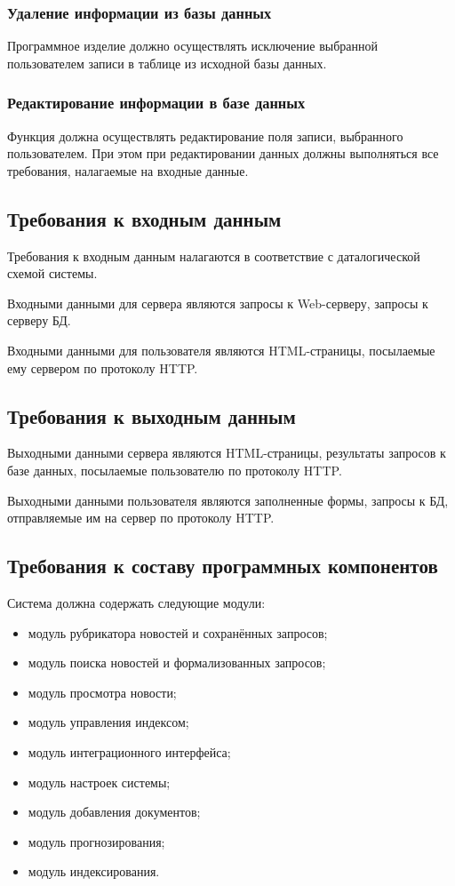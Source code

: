 \documentclass[russian,utf8,emptystyle]{eskdtext}
\begin{document}
\subsubsection{Удаление информации из базы данных}
Программное изделие должно осуществлять исключение выбранной пользователем записи в таблице из исходной базы данных.

\subsubsection{Редактирование информации в базе данных}

Функция должна осуществлять редактирование поля записи, выбранного пользователем. При этом при редактировании данных должны выполняться все требования, налагаемые на входные данные.

\subsection{Требования к входным данным}

Требования к входным данным налагаются в соответствие с даталогической схемой системы. 

Входными данными для сервера являются запросы к Web-серверу, запросы к серверу БД.

Входными данными для пользователя являются HTML-страницы, посылаемые ему сервером по протоколу HTTP.

\subsection{Требования к выходным данным}

Выходными данными сервера являются HTML-страницы, результаты запросов к базе данных, посылаемые пользователю по протоколу HTTP.

Выходными данными пользователя являются заполненные формы, запросы к БД, отправляемые им на сервер по протоколу HTTP.

\subsection{Требования к составу программных компонентов}

Система должна содержать следующие модули:
\begin{itemize}
\item модуль рубрикатора новостей и сохранённых запросов;
\item модуль поиска новостей и формализованных запросов;
\item модуль просмотра новости;
\item модуль управления индексом;
\item модуль интеграционного интерфейса;
\item модуль настроек системы;
\item модуль добавления документов;
\item модуль прогнозирования;
\item модуль индексирования.
\end{itemize}
\end{document}
